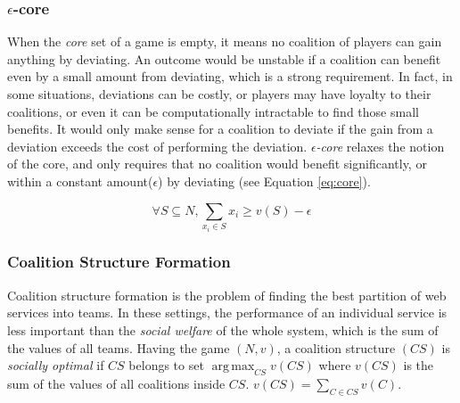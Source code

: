             \subsubsection*{$\epsilon$-core}\label{s:epsilon}
            When the \emph{core} set of a game is empty, it means no coalition
            of players can gain anything by deviating. An outcome would be
            unstable if a coalition can benefit even by a small amount from
            deviating, which is a strong requirement. In fact, in some
            situations, deviations can be costly, or players may have loyalty
            to their coalitions, or even it can be computationally intractable
            to find those small benefits. It would only make sense for a
            coalition to deviate if the gain from a deviation exceeds the cost
            of performing the deviation. \emph{$\epsilon$-core} relaxes the
            notion of the core, and only requires that no coalition would
            benefit significantly, or within a constant amount($\epsilon$) by
            deviating (see Equation \ref{eq:core}).

            \begin{equation}\label{eq:core2}
            \forall S \subseteq N, \sum_{x_i \in S} x_i \geq v(S) - \epsilon
            \end{equation}

            \subsubsection*{Coalition Structure Formation}\label{sec:coalition}

            Coalition structure formation is the problem of finding the best
            partition of web services into teams. In these settings, the
            performance of an individual service is less important than the
            \emph{social welfare} of the whole system, which is the sum of the
            values of all teams. Having the game $(N,v)$, a coalition
            structure $(CS)$ is \emph{socially optimal} if $CS$ belongs to set
            $\operatorname*{arg\,max}_{CS} v(CS)$ where $v(CS)$ is the sum of
            the values of all coalitions inside $CS$. $v(CS) = \sum_{C \in
            CS}v(C)$.



